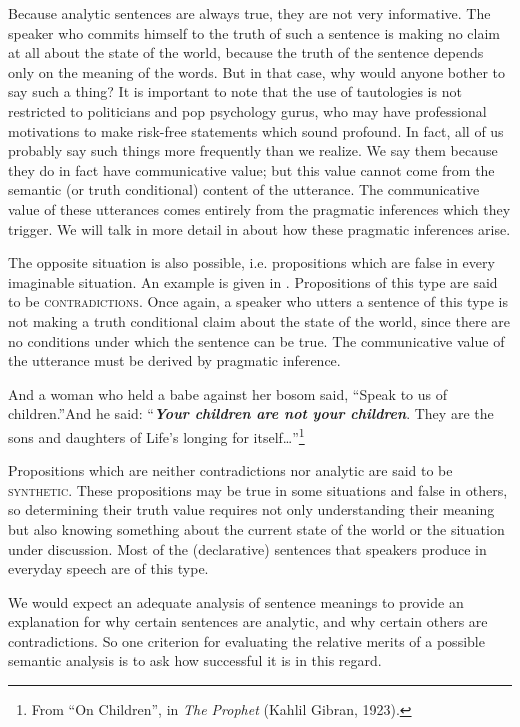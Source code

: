 Because analytic sentences are always true, they are not very informative. The speaker who commits himself to the truth of such a sentence is making no claim at all about the state of the world, because the truth of the sentence depends only on the meaning of the words. But in that case, why would anyone bother to say such a thing? It is important to note that the use of tautologies is not restricted to politicians and pop psychology gurus, who may have professional motivations to make risk-free statements which sound profound. In fact, all of us probably say such things more frequently than we realize. We say them because they do in fact have communicative value; but this value cannot come from the semantic (or truth conditional) content of the utterance. The communicative value of these utterances comes entirely from the pragmatic inferences which they trigger. We will talk in more detail in  about how these pragmatic inferences arise.



The opposite situation is also possible, i.e. propositions which are false in every imaginable situation. An example is given in . Propositions of this type are said to be \textsc{contradictions}. Once again, a speaker who utters a sentence of this type is not making a truth conditional claim about the state of the world, since there are no conditions under which the sentence can be true. The communicative value of the utterance must be derived by pragmatic inference.


\ea \label{ex:3.4}
And a woman who held a babe against her bosom said, “Speak to us of children.”And he said: “\textbf{\textit{Your children are not your children}}. They are the sons and daughters of Life’s longing for itself…”\footnote{From “On Children”, in \textit{The Prophet} (Kahlil Gibran, 1923).}
\z


Propositions which are neither contradictions nor analytic are said to be \textsc{synthetic}. These propositions may be true in some situations and false in others, so determining their truth value requires not only understanding their meaning but also knowing something about the current state of the world or the situation under discussion. Most of the (declarative) sentences that speakers produce in everyday speech are of this type.



We would expect an adequate analysis of sentence meanings to provide an explanation for why certain sentences are analytic, and why certain others are contradictions. So one criterion for evaluating the relative merits of a possible semantic analysis is to ask how successful it is in this regard.


